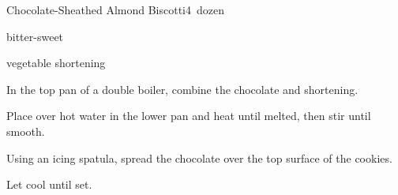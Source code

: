 \begin{recipe}{Chocolate-Sheathed Almond Biscotti}{}{4\half{}~dozen}

\begin{ingredients}
\item {} bitter-sweet 
\item \tp{\half} vegetable shortening
\end{ingredients}

\begin{directions}
\item In the top pan of a double boiler, combine the chocolate and shortening.
\item Place over hot water in the lower pan and heat until melted, then stir until smooth.
\item Using an icing spatula, spread the chocolate over the top surface of the cookies.
\item Let cool until set.
\end{directions}

\end{recipe}
